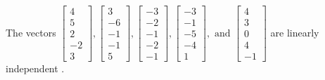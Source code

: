 \begin{exercise}
\begin{exerciseStatement}
  \end{exerciseStatement}
  \begin{exerciseAnswer}
   The vectors \(\left[\begin{array}{r}
4 \\
5 \\
2 \\
-2 \\
3
\end{array}\right] , \left[\begin{array}{r}
3 \\
-6 \\
-1 \\
-1 \\
5
\end{array}\right] , \left[\begin{array}{r}
-3 \\
-2 \\
-1 \\
-2 \\
-1
\end{array}\right] , \left[\begin{array}{r}
-3 \\
-1 \\
-5 \\
-4 \\
1
\end{array}\right] , \text{ and } \left[\begin{array}{r}
4 \\
3 \\
0 \\
4 \\
-1
\end{array}\right]\) are 
  	 linearly independent  .
  


  \end{exerciseAnswer}
\end{exercise}
